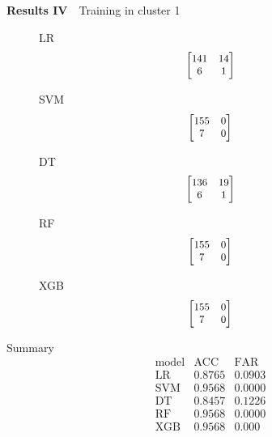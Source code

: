 \documentclass[12pt,aspectratio=43]{beamer}
\begin{document}
\begin{frame}{\textbf{Results IV}　{Training in cluster 1}}
\linespread{0.9}
{\small
\begin{figure}[h]
\centering

\begin{minipage}{0.28\linewidth}
\raggedright
{\small LR}
$$
\small
\begin{bmatrix}
141 & 14 \\
6  & 1
\end{bmatrix}
$$
\end{minipage}
\begin{minipage}{0.28\linewidth}
\raggedright
{\small SVM}
$$
\small
\begin{bmatrix}
155 & 0 \\
7  & 0
\end{bmatrix}
$$
\end{minipage}
\begin{minipage}{0.28\linewidth}
\raggedright
{\small DT}
$$
\small
\begin{bmatrix}
136 & 19 \\
6  & 1
\end{bmatrix}
$$
\end{minipage}

\vspace{0.5em}

\begin{minipage}{0.28\linewidth}
\raggedright
{\small RF}
$$
\small
\begin{bmatrix}
155 & 0 \\
7  & 0
\end{bmatrix}
$$
\end{minipage}
\begin{minipage}{0.28\linewidth}
\raggedright
{\small XGB}
$$
\small
\begin{bmatrix}
155 & 0 \\
7  & 0
\end{bmatrix}
$$
\end{minipage}

\end{figure}
}

{\small
Summary
$$
\begin{array}{l|cc}
\text{model} & \text{ACC} & \text{FAR} \\
\hline
\text{LR} & 0.8765 & 0.0903 \\
\text{SVM} & 0.9568 & 0.0000 \\
\text{DT} & 0.8457 & 0.1226\\
\text{RF} & 0.9568 & 0.0000 \\
\text{XGB} & 0.9568 & 0.000 \\
\end{array}
$$
}

\end{frame}
\end{document}
